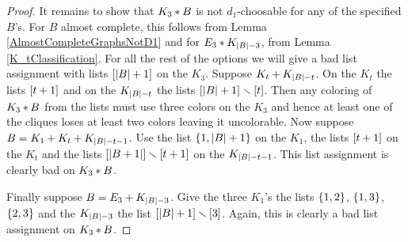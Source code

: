 \begin{proof}
It remains to show that $K_3 \mbox{\hspace{2 pt}$\ast$\hspace{2 pt}} B$ is not $d_1$-choosable for any of the
specified $B$'s.  For $B$ almost complete, this follows from Lemma
\ref{AlmostCompleteGraphsNotD1} and for $E_3 \mbox{\hspace{2 pt}$\ast$\hspace{2 pt}} K_{\left|B\right| - 3}$, from
Lemma \ref{K_tClassification}.  For all the rest of the options we will give a
bad list assignment with lists $\left[\left|B\right|+1\right]$ on the $K_3$.
Suppose $K_t \mbox{\hspace{2 pt}$+$\hspace{2 pt}} K_{\left|B\right| - t}$.  On the $K_t$ the lists $\left[t +
1\right]$ and on the $K_{\left|B\right| - t}$ the lists $\left[\left|B\right| + 1\right] \smallsetminus \left[t\right]$.  Then any coloring of $K_3 \mbox{\hspace{2 pt}$\ast$\hspace{2 pt}} B$ from the lists
must use three colors on the $K_3$ and hence at least one of the cliques
loses at least two colors leaving it uncolorable.  Now
suppose $B = K_1 \mbox{\hspace{2 pt}$+$\hspace{2 pt}} K_t \mbox{\hspace{2 pt}$+$\hspace{2 pt}} K_{\left|B\right| - t - 1}$.  Use
the list $\left\{ 1, \left|B\right| + 1 \right\}$ on the $K_1$, the lists $\left[t +
1\right]$ on the $K_t$ and the lists $\left[\left|B + 1\right|\right]
\smallsetminus \left[t + 1\right]$ on the $K_{\left|B\right| - t - 1}$.  This list
assignment is clearly bad on $K_3 \mbox{\hspace{2 pt}$\ast$\hspace{2 pt}} B$.  

Finally suppose $B = E_3 \mbox{\hspace{2 pt}$+$\hspace{2 pt}} K_{\left|B\right| - 3}$.  Give the three $K_1$'s the lists
$\left\{ 1,2 \right\}$, $\left\{ 1,3 \right\}$, $\left\{ 2,3 \right\}$ and the $K_{\left|B\right| - 3}$ the list
$\left[\left|B\right| + 1\right] \smallsetminus \left[3\right]$.  Again, this is clearly a bad
list assignment on $K_3 \mbox{\hspace{2 pt}$\ast$\hspace{2 pt}} B$.
\end{proof}




